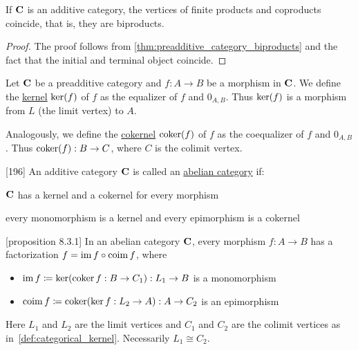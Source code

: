 \begin{theorem}\label{thm:additive_category_biproducts}
  If $\operatorname{\mathbf{C}}$ is an additive category, the vertices of finite products and coproducts coincide, that is, they are biproducts.
\end{theorem}
\begin{proof}
  The proof follows from \cref{thm:preadditive_category_biproducts} and the fact that the initial and terminal object coincide.
\end{proof}

\begin{definition}\label{def:categorical_kernel}
  Let $\operatorname{\mathbf{C}}$ be a preadditive category and $f: A \to B$ be a morphism in $\operatorname{\mathbf{C}}$. We define the \ul{kernel} $\operatorname{ker}(f)$ of $f$ as the equalizer of $f$ and $0_{A,B}$. Thus $\operatorname{ker}(f)$ is a morphism from $L$ (the limit vertex) to $A$.

  Analogously, we define the \ul{cokernel} $\operatorname{coker}(f)$ of $f$ as the coequalizer of $f$ and $0_{A,B}$. Thus $\operatorname{coker}(f): B \to C$, where $C$ is the colimit vertex.
\end{definition}

\begin{definition}\label{def:abelian_category}\cite{MacLane1994}[196]
  An additive category $\operatorname{\mathbf{C}}$ is called an \ul{abelian category} if:
  \begin{defenum}
    \item $\operatorname{\mathbf{C}}$ has a kernel and a cokernel for every morphism
    \item every monomorphism is a kernel and every epimorphism is a cokernel
  \end{defenum}
\end{definition}

\begin{proposition}\label{def:abelian_category_morphism_factorization}\cite{MacLane1994}[proposition 8.3.1]
  In an abelian category $\operatorname{\mathbf{C}}$, every morphism $f: A \to B$ has a factorization $f = \operatorname{im} f \circ \operatorname{coim} f$, where
  \begin{itemize}
    \item $\operatorname{im} f \coloneqq \operatorname{ker}(\operatorname{coker} f: B \to C_1): L_1 \to B$ is a monomorphism
    \item $\operatorname{coim} f \coloneqq \operatorname{coker}(\operatorname{ker} f: L_2 \to A): A \to C_2$ is an epimorphism
  \end{itemize}
  Here $L_1$ and $L_2$ are the limit vertices and $C_1$ and $C_2$ are the colimit vertices as in~\cref{def:categorical_kernel}. Necessarily $L_1 \cong C_2$.
\end{proposition}

